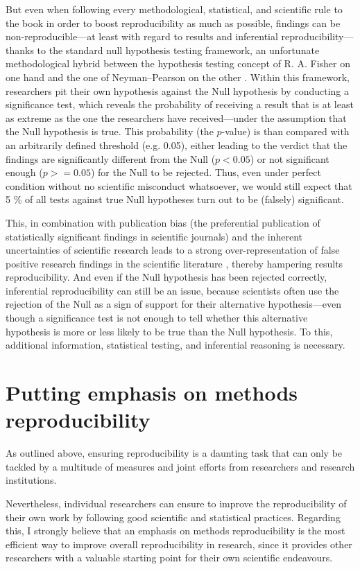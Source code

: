 \documentclass[11pt, a4paper,twoside]{report}\usepackage[]{graphicx}\usepackage[]{color}
\begin{document}
But even when following every methodological, statistical, and scientific rule to the book in order to boost reproducibility as much as possible, findings can be non-reproducible---at least with regard to results and inferential reproducibility---thanks to the standard null hypothesis testing framework, an unfortunate methodological hybrid between the hypothesis testing concept of R. A. Fisher on one hand and the one of Neyman--Pearson on the other \citep{amrhein_earth_2017}. Within this framework, researchers pit their own hypothesis against the Null hypothesis by conducting a significance test, which reveals the probability of receiving a result that is at least as extreme as the one the researchers have received---under the assumption that the Null hypothesis is true. This probability (the $p$-value) is than compared with an arbitrarily defined threshold (e.g. 0.05), either leading to the verdict that the findings are significantly different from the Null ($p < 0.05$) or not significant enough ($p >= 0.05$) for the Null to be rejected. Thus, even under perfect condition without no scientific misconduct whatsoever, we would still expect that 5 \% of all tests against true Null hypotheses turn out to be (falsely) significant. 

This, in combination with publication bias (the preferential publication of statistically significant findings in scientific journals) and the inherent uncertainties of scientific research leads to a strong over-representation of false positive research findings in the scientific literature \citep{ioannidis_why_2005}, thereby hampering results reproducibility. And even if the Null hypothesis has been rejected correctly, inferential reproducibility can still be an issue, because scientists often use the rejection of the Null as a sign of support for their alternative hypothesis---even though a significance test is not enough to tell whether this alternative hypothesis is more or less likely to be true than the Null hypothesis. To this, additional information, statistical testing, and inferential reasoning is necessary.

\section{Putting emphasis on methods reproducibility}
As outlined above, ensuring reproducibility is a daunting task that can only be tackled by a multitude of measures and joint efforts from researchers and research institutions. 

Nevertheless, individual researchers can ensure to improve the reproducibility of their own work by following good scientific and statistical practices. Regarding this, I strongly believe that an emphasis on methods reproducibility is the most efficient way to improve overall reproducibility in research, since it provides other researchers with a valuable starting point for their own scientific endeavours.
\end{document}
